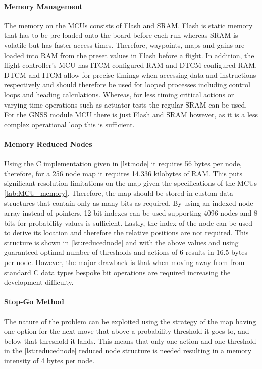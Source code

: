 \paragraph{Memory Management}
The memory on the \gls{MCU}s consists of Flash and \gls{SRAM}. Flash is static memory that has to be pre-loaded onto the board before each run whereas \gls{SRAM} is volatile but has faster access times. Therefore, waypoints, maps and gains are loaded into \gls{RAM} from the preset values in Flash before a flight. In addition, the flight controller's \gls{MCU} has \gls{ITCM} configured \gls{RAM} and \gls{DTCM} configured \gls{RAM}. \gls{DTCM} and \gls{ITCM} allow for precise timings when accessing data and instructions respectively and should therefore be used for looped processes including control loops and heading calculations. Whereas, for less timing critical actions or varying time operations such as actuator tests the regular \gls{SRAM} can be used. For the \gls{GNSS} module \gls{MCU} there is just Flash and \gls{SRAM} however, as it is a less complex operational loop this is sufficient. 

\paragraph{Memory Reduced Nodes}
Using the C implementation given in \ref{lst:node} it requires 56 bytes per node, therefore, for a 256 node map it requires 14.336 kilobytes of \gls{RAM}. This puts significant resolution limitations on the map given the specifications of the \gls{MCU}s \ref{tab:MCU_memory}. Therefore, the map should be stored in custom data structures that contain only as many bits as required. By using an indexed node array instead of pointers, 12 bit indexes can be used supporting 4096 nodes and 8 bits for probability values is sufficient. Lastly, the index of the node can be used to derive its location and therefore the relative positions are not required. This structure is shown in \ref{lst:reducednode} and with the above values and using guaranteed optimal number of thresholds and actions of 6 results in 16.5 bytes per node. However, the major drawback is that when moving away from from standard C data types bespoke bit operations are required increasing the development difficulty. 
\paragraph{Stop-Go Method}
The nature of the problem can be exploited using the strategy of the map having one option for the next move that above a probability threshold it goes to, and below that threshold it lands. This means that only one action and one threshold in the \ref{lst:reducednode} reduced node structure is needed resulting in a memory intensity of 4 bytes per node. 
